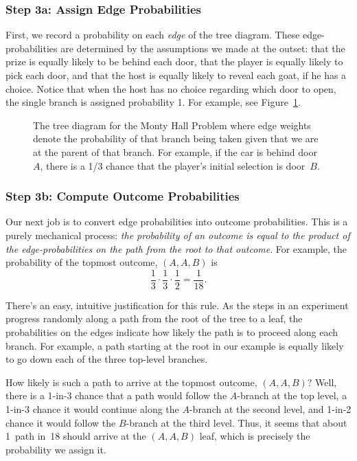 \subsubsection{Step 3a: Assign Edge Probabilities}

First, we record a probability on each \emph{edge} of the tree
diagram.  These edge-probabilities are determined by the assumptions
we made at the outset: that the prize is equally likely to be behind
each door, that the player is equally likely to pick each door, and
that the host is equally likely to reveal each goat, if he has a
choice.  Notice that when the host has no choice regarding which door
to open, the single branch is assigned probability 1.  For example,
see Figure~\ref{fig:14A5}.

\begin{figure}[h]


\caption{The tree diagram for the Monty Hall Problem where edge
  weights denote the probability of that branch being taken given that
we are at the parent of that branch.  For example, if the car is
behind door~$A$, there is a 1/3 chance that the player's initial
selection is door~$B$.}

\label{fig:14A5}

\end{figure}

\subsubsection{Step 3b: Compute Outcome Probabilities}

Our next job is to convert edge probabilities into outcome
probabilities.  This is a purely mechanical process: \emph{the
probability of an outcome is equal to the product of the
edge-probabilities on the path from the root to that outcome}.  For
example, the probability of the topmost outcome, $(A, A, B)$ is
\[
\frac{1}{3} \cdot \frac{1}{3} \cdot \frac{1}{2} = \frac{1}{18}.
\]

There's an easy, intuitive justification for this rule.  As the steps in
an experiment progress randomly along a path from the root of the tree to
a leaf, the probabilities on the edges indicate how likely the path is to
proceed along each branch.  For example, a path starting at the root in
our example is equally likely to go down each of the three top-level
branches.

How likely is such a path to arrive at the topmost outcome, $(A,
A, B)$?  Well, there is a 1-in-3 chance that a path would follow the
$A$-branch at the top level, a 1-in-3 chance it would continue along
the $A$-branch at the second level, and 1-in-2 chance it would follow
the $B$-branch at the third level.  Thus, it seems that about 1~path
in~18 should arrive at the $(A, A, B)$ leaf, which is precisely the
probability we assign it.

